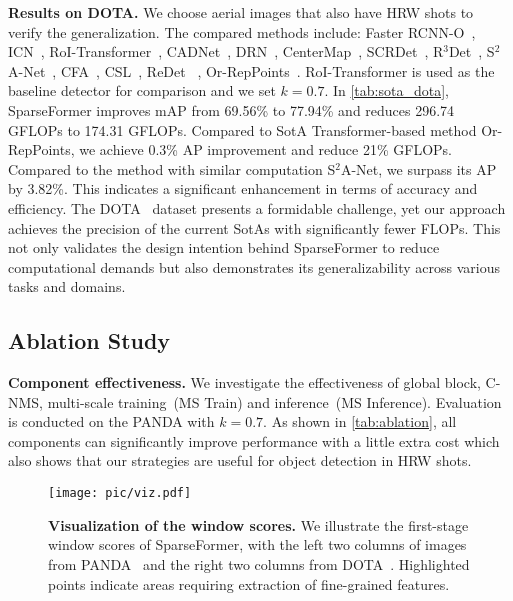 \vspace{2mm}\noindent\textbf{Results on  DOTA.} 
We choose aerial images that also have HRW shots to verify the generalization.
The compared methods include: Faster RCNN-O~\cite{ren2015faster}, ICN~\cite{azimi2018towards}, RoI-Transformer~\cite{ding2018learning}, CADNet~\cite{zhang2019cad}, DRN~\cite{pan2020dynamic}, CenterMap~\cite{wang2020learning}, SCRDet~\cite{yang2022scrdet++}, R$^3$Det~\cite{yang2021r3det},  S$^2$A-Net~\cite{han2021align}, CFA~\cite{Guo_2021CVPR_CFA}, CSL~\cite{yang2020arbitrary}, ReDet~\cite{han2021redet} , Or-RepPoints~\cite{li2022oriented}. RoI-Transformer is used as the baseline detector for comparison and we set $k=0.7$. In \cref{tab:sota_dota}, SparseFormer improves mAP from 69.56\% to 77.94\% and reduces 296.74 GFLOPs to 174.31 GFLOPs.
Compared to SotA Transformer-based method Or-RepPoints, we achieve 0.3\% AP improvement and reduce 21\% GFLOPs. Compared to the method with similar computation S$^2$A-Net, we surpass its AP by 3.82\%. 
This indicates a significant enhancement in terms of accuracy and efficiency. 
The DOTA~\cite{xia2018dota} dataset presents a formidable challenge, yet our approach achieves the precision of the current SotAs with significantly fewer FLOPs. This not only validates the design intention behind SparseFormer to reduce computational demands but also demonstrates its generalizability across various tasks and domains.
\subsection{Ablation Study}
\vspace{2mm}\noindent\textbf{Component effectiveness.} We investigate the effectiveness of global block, C-NMS, multi-scale training~(MS Train) and inference~(MS Inference). Evaluation is conducted on the PANDA with $k=0.7$. As shown in \cref{tab:ablation}, all components can significantly improve performance with a little extra cost which also shows that our strategies are useful for object detection in HRW shots. 


\begin{figure*}[!]
	\begin{center}
		\texttt{[image: pic/viz.pdf]}
	\end{center}
	\vspace{-7pt}
    \caption{\textbf{Visualization of the window scores.} We illustrate the first-stage window scores of SparseFormer, with the left two columns of images from PANDA~\cite{wang2020panda} and the right two columns from DOTA~\cite{xia2018dota}. Highlighted points indicate areas requiring extraction of fine-grained features.}
	\label{fig:viz}	
 \vspace{-5pt}
\end{figure*}


